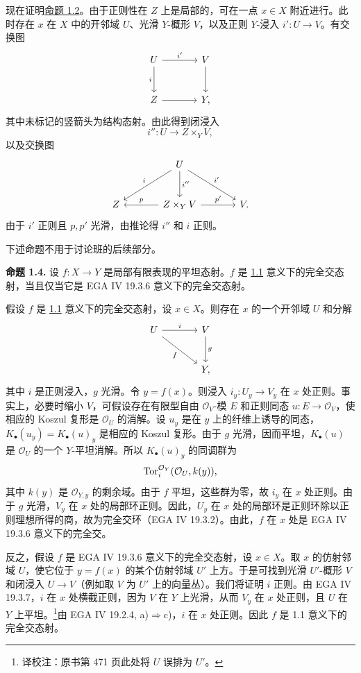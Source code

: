 现在证明\hyperlink{sga6.e08.prop.1-2}{命题 1.2}。由于正则性在 $Z$ 上是局部的，可在一点 $x\in X$ 附近进行。此时存在 $x$ 在 $X$ 中的开邻域 $U$、光滑 $Y$-概形 $V$，以及正则 $Y$-浸入 $i':U\to V$。有交换图
\[
\begin{tikzcd}[column sep=large,row sep=large]
U \arrow[r,"i'"] \arrow[d,"i"'] & V \arrow[d]\\
Z \arrow[r] & Y,
\end{tikzcd}
\]
其中未标记的竖箭头为结构态射。由此得到闭浸入
\[
i'':U\longrightarrow Z\times_Y V,
\]
以及交换图
\[
\begin{tikzcd}[column sep=large,row sep=large]
& U \arrow[dl,"i"'] \arrow[d,"i''"] \arrow[dr,"i'"] &\\
Z & Z\times_Y V \arrow[l,"p"'] \arrow[r,"p'"] & V.
\end{tikzcd}
\]
由于 $i'$ 正则且 $p,p'$ 光滑，由推论得 $i''$ 和 $i$ 正则。

下述命题不用于讨论班的后续部分。

\textbf{命题 1.4.} 设 $f:X\to Y$ 是局部有限表现的平坦态射。$f$ 是 \hyperlink{sga6.e08.def.1-1}{1.1} 意义下的完全交态射，当且仅当它是 EGA IV 19.3.6 意义下的完全交态射。

假设 $f$ 是 \hyperlink{sga6.e08.def.1-1}{1.1} 意义下的完全交态射，设 $x\in X$。则存在 $x$ 的一个开邻域 $U$ 和分解
\[
\begin{tikzcd}[column sep=large,row sep=large]
U \arrow[r,"i"] \arrow[dr,"f"'] & V \arrow[d,"g"]\\
& Y,
\end{tikzcd}
\]
其中 $i$ 是正则浸入，$g$ 光滑。令 $y=f(x)$。则浸入 $i_y:U_y\to V_y$ 在 $x$ 处正则。事实上，必要时缩小 $V$，可假设存在有限型自由 $\mathcal O_V$-模 $E$ 和正则同态 $u:E\to\mathcal O_V$，使相应的 Koszul 复形是 $\mathcal O_U$ 的消解。设 $u_y$ 是在 $y$ 上的纤维上诱导的同态，$K_\bullet(u_y)=K_\bullet(u)_y$ 是相应的 Koszul 复形。由于 $g$ 光滑，因而平坦，$K_\bullet(u)$ 是 $\mathcal O_U$ 的一个 $Y$-平坦消解。所以 $K_\bullet(u)_y$ 的同调群为
\[
\operatorname{Tor}_i^{\mathcal O_Y}(\mathcal O_U,k(y)),
\]
其中 $k(y)$ 是 $\mathcal O_{Y,y}$ 的剩余域。由于 $f$ 平坦，这些群为零，故 $i_y$ 在 $x$ 处正则。由于 $g$ 光滑，$V_y$ 在 $x$ 处的局部环正则。因此，$U_y$ 在 $x$ 处的局部环是正则环除以正则理想所得的商，故为完全交环（EGA IV 19.3.2）。由此，$f$ 在 $x$ 处是 EGA IV 19.3.6 意义下的完全交。

反之，假设 $f$ 是 EGA IV 19.3.6 意义下的完全交态射，设 $x\in X$。取 $x$ 的仿射邻域 $U$，使它位于 $y=f(x)$ 的某个仿射邻域 $U'$ 上方。于是可找到光滑 $U'$-概形 $V$ 和闭浸入 $U\to V$（例如取 $V$ 为 $U'$ 上的向量丛）。我们将证明 $i$ 正则。由 EGA IV 19.3.7，$i$ 在 $x$ 处横截正则，因为 $V$ 在 $Y$ 上光滑，从而 $V_y$ 在 $x$ 处正则，且 $U$ 在 $Y$ 上平坦。\footnote{译校注：原书第 471 页此处将 $U$ 误排为 $U'$。}由 EGA IV 19.2.4, a)$\Rightarrow$c)，$i$ 在 $x$ 处正则。因此 $f$ 是 1.1 意义下的完全交态射。

